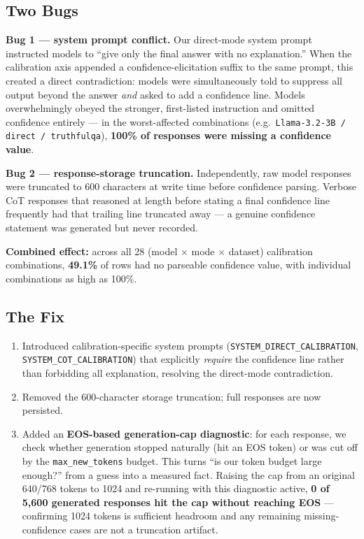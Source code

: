 \documentclass{article}
\begin{document}
\subsection{Two Bugs}

\textbf{Bug 1 --- system prompt conflict.} Our direct-mode system prompt instructed models to ``give only the final answer with no explanation.'' When the calibration axis appended a confidence-elicitation suffix to the same prompt, this created a direct contradiction: models were simultaneously told to suppress all output beyond the answer \emph{and} asked to add a confidence line. Models overwhelmingly obeyed the stronger, first-listed instruction and omitted confidence entirely --- in the worst-affected combinations (e.g.\ \texttt{Llama-3.2-3B / direct / truthfulqa}), \textbf{100\% of responses were missing a confidence value}.

\textbf{Bug 2 --- response-storage truncation.} Independently, raw model responses were truncated to 600 characters at write time before confidence parsing. Verbose CoT responses that reasoned at length before stating a final confidence line frequently had that trailing line truncated away --- a genuine confidence statement was generated but never recorded.

\textbf{Combined effect:} across all 28 (model $\times$ mode $\times$ dataset) calibration combinations, \textbf{49.1\%} of rows had no parseable confidence value, with individual combinations as high as 100\%.

\subsection{The Fix}

\begin{enumerate}
    \item Introduced calibration-specific system prompts (\texttt{SYSTEM\_DIRECT\_CALIBRATION}, \texttt{SYSTEM\_COT\_CALIBRATION}) that explicitly \emph{require} the confidence line rather than forbidding all explanation, resolving the direct-mode contradiction.
    \item Removed the 600-character storage truncation; full responses are now persisted.
    \item Added an \textbf{EOS-based generation-cap diagnostic}: for each response, we check whether generation stopped naturally (hit an EOS token) or was cut off by the \texttt{max\_new\_tokens} budget. This turns ``is our token budget large enough?'' from a guess into a measured fact. Raising the cap from an original 640/768 tokens to 1024 and re-running with this diagnostic active, \textbf{0 of 5,600 generated responses hit the cap without reaching EOS} --- confirming 1024 tokens is sufficient headroom and any remaining missing-confidence cases are not a truncation artifact.
\end{enumerate}
\end{document}
